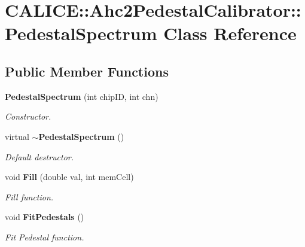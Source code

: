 \section{C\-A\-L\-I\-C\-E\-:\-:Ahc2\-Pedestal\-Calibrator\-:\-:Pedestal\-Spectrum Class Reference}
\label{classCALICE_1_1Ahc2PedestalCalibrator_1_1PedestalSpectrum}
\subsection*{Public Member Functions}
\begin{DoxyCompactItemize}
\item 
{\bf Pedestal\-Spectrum} (int chip\-I\-D, int chn)
\begin{DoxyCompactList}\small\item\em Constructor. \end{DoxyCompactList}\item 
virtual {\bf $\sim$\-Pedestal\-Spectrum} ()\label{classCALICE_1_1Ahc2PedestalCalibrator_1_1PedestalSpectrum_a8d608d0c276148d7d197361cc75d0fd7}

\begin{DoxyCompactList}\small\item\em Default destructor. \end{DoxyCompactList}\item 
void {\bf Fill} (double val, int mem\-Cell)
\begin{DoxyCompactList}\small\item\em Fill function. \end{DoxyCompactList}\item 
void {\bf Fit\-Pedestals} ()
\begin{DoxyCompactList}\small\item\em Fit Pedestal function. \end{DoxyCompactList}\end{DoxyCompactItemize}

